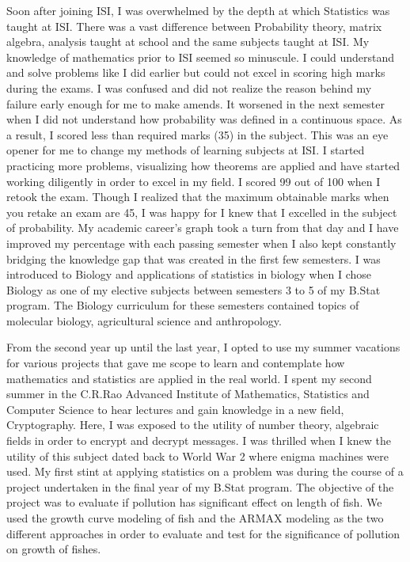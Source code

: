 \documentclass[12pt]{article}
\begin{document}
Soon after joining ISI, I was overwhelmed by the depth at which Statistics was taught at ISI. There was a vast difference between Probability theory, matrix algebra, analysis taught at school and the same subjects taught at ISI. My knowledge of mathematics prior to ISI seemed so minuscule. I could understand and solve problems like I did earlier but could not excel in scoring high marks during the exams. I was confused and did not realize the reason behind my failure early enough for me to make amends. It worsened in the next semester when I did not understand how probability was defined in a continuous space. As a result, I scored less than required marks (35) in the subject. This was an eye opener for me to change my methods of learning subjects at ISI. I started practicing more problems, visualizing how theorems are applied and have started working diligently in order to excel in my field. I scored 99 out of 100 when I retook the exam. Though I realized that the maximum obtainable marks when you retake an exam are 45, I was happy for I knew that I excelled in the subject of probability. My academic career's graph took a turn from that day and I have improved my percentage with each passing semester when I also kept constantly bridging the knowledge gap that was created in the first few semesters. I was introduced to Biology and applications of statistics in biology when I chose Biology as one of my elective subjects between semesters 3 to 5 of my B.Stat program. The Biology curriculum for these semesters contained topics of molecular biology, agricultural science and anthropology.

From the second year up until the last year, I opted to use my summer vacations for various projects that gave me scope to learn and contemplate how mathematics and statistics are applied in the real world. I spent my second summer in the C.R.Rao Advanced Institute of Mathematics, Statistics and Computer Science to hear lectures and gain knowledge in a new field, Cryptography. Here, I was exposed to the utility of number theory, algebraic fields in order to encrypt and decrypt messages. I was thrilled when I knew the utility of this subject dated back to World War 2 where enigma machines were used. My first stint at applying statistics on a problem was during the course of a project undertaken in the final year of my B.Stat program. The objective of the project was to evaluate if pollution has significant effect on length of fish. We used the growth curve modeling of fish and the ARMAX modeling as the two different approaches in order to evaluate and test for the significance of pollution on growth of fishes. 
\end{document}
